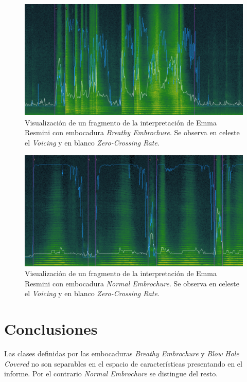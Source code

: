 \documentclass{article}
\begin{document}
\begin{figure}[H]
\begin{center}
\includegraphics[width=1\textwidth]{breathyemb_features} 
\caption{Visualización de un fragmento de la interpretación de Emma Resmini con embocadura \textit{Breathy Embrochure}. Se observa en celeste el \textit{Voicing} y en blanco \textit{Zero-Crossing Rate}.}
\label{fig:breathyemb_features}
\end{center}
\end{figure}


\begin{figure}[H]
\begin{center}
\includegraphics[width=1\textwidth]{normalemb_features} 
\caption{Visualización de un fragmento de la interpretación de Emma Resmini con embocadura \textit{Normal Embrochure}. Se observa en celeste el \textit{Voicing} y en blanco \textit{Zero-Crossing Rate}.}
\label{fig:normalemb_features}
\end{center}
\end{figure}

\section*{Conclusiones}

Las clases definidas por las embocaduras \textit{Breathy Embrochure} y \textit{Blow Hole Covered} no son separables en el espacio de características presentando en el informe. Por el contrario \textit{Normal Embrochure} se distingue del resto.  



\newpage




\end{document}
